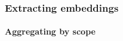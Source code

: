 \documentclass[10pt, t, xcolor={usenames,dvipsnames,svgnames}, compress]{beamer}
\begin{document}
\begin{frame}
  \frametitle{Extracting embeddings}
  \framesubtitle{Aggregating by scope}
  \begin{minipage}{0.4\linewidth}
    \begin{center}

\end{center}
\end{minipage}
\end{frame}
\end{document}
